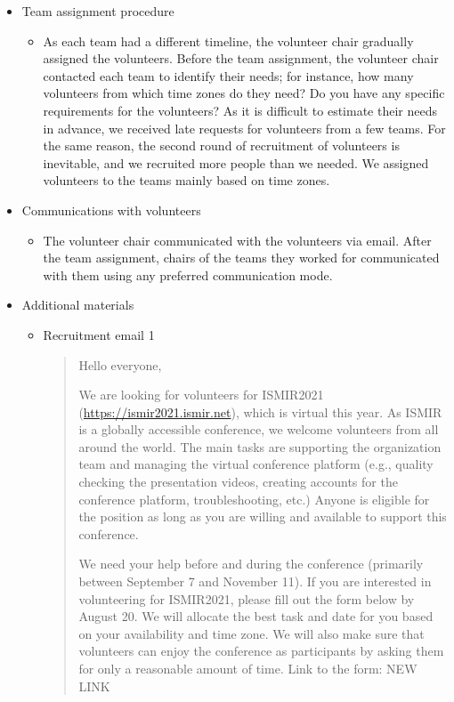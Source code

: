 \documentclass[%
10pt,								%
titlepage,						%
]
{scrartcl}
\begin{document}
\begin{itemize}
\begin{itemize}
                \end{itemize}
            \item   Team assignment procedure
                \begin{itemize}
                    \item   As each team had a different timeline, the volunteer chair gradually assigned the volunteers. Before the team assignment, the volunteer chair contacted each team to identify their needs; for instance, how many volunteers from which time zones do they need? Do you have any specific requirements for the volunteers? As it is difficult to estimate their needs in advance, we received late requests for volunteers from a few teams. For the same reason, the second round of recruitment of volunteers is inevitable, and we recruited more people than we needed. We assigned volunteers to the teams mainly based on time zones. 
                \end{itemize}
            \item   Communications with volunteers
                \begin{itemize}
                    \item  The volunteer chair communicated with the volunteers via email. After the team assignment, chairs of the teams they worked for communicated with them using any preferred communication mode.  
                \end{itemize}
            \item   Additional materials
                \begin{itemize}
                    \item Recruitment email 1
                        \begin{quote}
                            Hello everyone, 

We are looking for volunteers for ISMIR2021 (\href{https://ismir2021.ismir.net}{https://ismir2021.ismir.net}), which is virtual this year. As ISMIR is a globally accessible conference, we welcome volunteers from all around the world. The main tasks are supporting the organization team and managing the virtual conference platform (e.g., quality checking the presentation videos, creating accounts for the conference platform, troubleshooting, etc.) Anyone is eligible for the position as long as you are willing and available to support this conference.

We need your help before and during the conference (primarily between September 7 and November 11). If you are interested in volunteering for ISMIR2021, please fill out the form below by August 20. We will allocate the best task and date for you based on your availability and time zone. We will also make sure that volunteers can enjoy the conference as participants by asking them for only a reasonable amount of time. 
Link to the form: NEW LINK


\end{quote}
\end{itemize}
\end{itemize}
\end{document}
